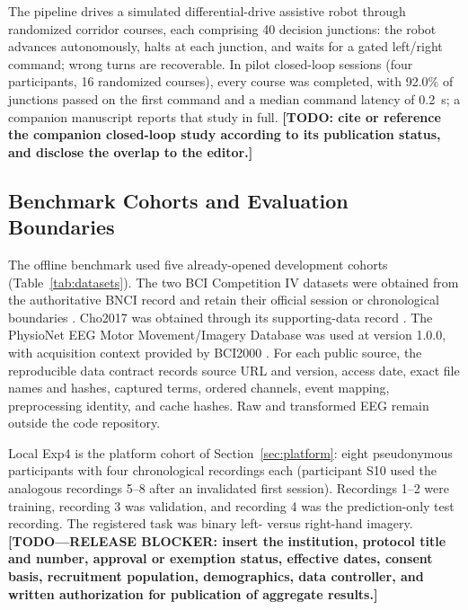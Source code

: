 \documentclass[journal,twoside,web]{template/ieeecolor2-tectonic}
\begin{document}
The pipeline drives a simulated differential-drive assistive robot through randomized corridor courses, each comprising 40 decision junctions: the robot advances autonomously, halts at each junction, and waits for a gated left/right command; wrong turns are recoverable. In pilot closed-loop sessions (four participants, 16 randomized courses), every course was completed, with 92.0\% of junctions passed on the first command and a median command latency of 0.2~s; a companion manuscript reports that study in full. \textbf{[TODO: cite or reference the companion closed-loop study according to its publication status, and disclose the overlap to the editor.]}

\subsection{Benchmark Cohorts and Evaluation Boundaries}

The offline benchmark used five already-opened development cohorts (Table~\ref{tab:datasets}). The two BCI Competition IV datasets were obtained from the authoritative BNCI record and retain their official session or chronological boundaries \cite{Tangermann2012,Leeb2007}. Cho2017 was obtained through its supporting-data record \cite{Cho2017,ChoData2017}. The PhysioNet EEG Motor Movement/Imagery Database was used at version 1.0.0, with acquisition context provided by BCI2000 \cite{Schalk2009,Schalk2004}. For each public source, the reproducible data contract records source URL and version, access date, exact file names and hashes, captured terms, ordered channels, event mapping, preprocessing identity, and cache hashes. Raw and transformed EEG remain outside the code repository.

Local Exp4 is the platform cohort of Section~\ref{sec:platform}: eight pseudonymous participants with four chronological recordings each (participant S10 used the analogous recordings 5--8 after an invalidated first session). Recordings 1--2 were training, recording 3 was validation, and recording 4 was the prediction-only test recording. The registered task was binary left- versus right-hand imagery. \textbf{[TODO---RELEASE BLOCKER: insert the institution, protocol title and number, approval or exemption status, effective dates, consent basis, recruitment population, demographics, data controller, and written authorization for publication of aggregate results.]}
\end{document}

